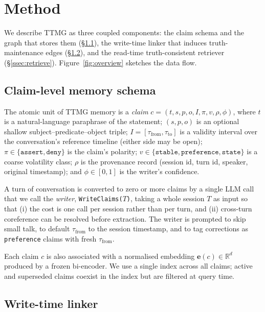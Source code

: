 \section{Method}
\label{sec:method}

We describe TTMG as three coupled components: the claim schema and the
graph that stores them (\S\ref{ssec:schema}), the write-time linker that
induces truth-maintenance edges (\S\ref{ssec:linker}), and the
read-time truth-consistent retriever (\S\ref{ssec:retrieve}).
Figure~\ref{fig:overview} sketches the data flow.



\subsection{Claim-level memory schema}
\label{ssec:schema}

The atomic unit of TTMG memory is a \emph{claim} $c = (t, s, p, o, I,
\pi, v, \rho, \phi)$, where $t$ is a natural-language paraphrase of the
statement; $(s, p, o)$ is an optional shallow subject--predicate--object
triple; $I = [\tau_{\text{from}}, \tau_{\text{to}}]$ is a validity
interval over the conversation's reference timeline (either side may
be open); $\pi \in \{\texttt{assert}, \texttt{deny}\}$ is the claim's
polarity; $v \in \{\texttt{stable}, \texttt{preference},
\texttt{state}\}$ is a coarse volatility class; $\rho$ is the
provenance record (session id, turn id, speaker, original timestamp);
and $\phi \in [0, 1]$ is the writer's confidence.

A turn of conversation is converted to zero or more claims by a single
LLM call that we call the \emph{writer}, \texttt{WriteClaims($T$)},
taking a whole session $T$ as input so that (i) the cost is one call
per session rather than per turn, and (ii) cross-turn coreference can
be resolved before extraction. The writer is prompted to skip small
talk, to default $\tau_{\text{from}}$ to the session timestamp, and to
tag corrections as \texttt{preference} claims with fresh
$\tau_{\text{from}}$.

Each claim $c$ is also associated with a normalised embedding
$\mathbf{e}(c) \in \mathbb{R}^{d}$ produced by a frozen bi-encoder. We
use a single index across all claims; active and superseded claims
coexist in the index but are filtered at query time.

\subsection{Write-time linker}
\label{ssec:linker}

